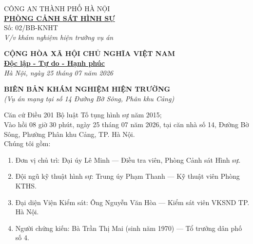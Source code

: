 \documentclass[12pt,a4paper]{article}
\begin{document}
\noindent
\begin{minipage}[t]{0.45\textwidth}
    \begin{center}
        \small
        CÔNG AN THÀNH PHỐ HÀ NỘI\\
        \textbf{\underline{PHÒNG CẢNH SÁT HÌNH SỰ}}\\[0.1cm]
        Số: 02/BB-KNHT\\
        \textit{V/v khám nghiệm hiện trường vụ án}
    \end{center}
\end{minipage}
\hfill
\begin{minipage}[t]{0.52\textwidth}
    \begin{center}
        \small
        \textbf{CỘNG HÒA XÃ HỘI CHỦ NGHĨA VIỆT NAM}\\
        \textbf{\underline{Độc lập - Tự do - Hạnh phúc}}\\[0.1cm]
        \textit{Hà Nội, ngày 25 tháng 07 năm 2026}
    \end{center}
\end{minipage}

\vspace{0.6cm}

\begin{center}
    \textbf{\large BIÊN BẢN KHÁM NGHIỆM HIỆN TRƯỜNG}\\
    \textit{(Vụ án mạng tại số 14 Đường Bờ Sông, Phân khu Cảng)}
\end{center}

\vspace{0.3cm}

\noindent Căn cứ Điều 201 Bộ luật Tố tụng hình sự năm 2015;\\
Vào hồi 08 giờ 30 phút, ngày 25 tháng 07 năm 2026, tại căn nhà số 14, Đường Bờ Sông, Phường Phân khu Cảng, TP. Hà Nội.\\[0.1cm]
Chúng tôi gồm:
\begin{enumerate}[label=\arabic*., leftmargin=1.5cm]
    \item Đơn vị chủ trì: Đại úy Lê Minh — Điều tra viên, Phòng Cảnh sát Hình sự.
    \item Đội ngũ kỹ thuật hình sự: Trung úy Phạm Thanh — Kỹ thuật viên Phòng KTHS.
    \item Đại diện Viện Kiểm sát: Ông Nguyễn Văn Hòa — Kiểm sát viên VKSND TP. Hà Nội.
    \item Người chứng kiến: Bà Trần Thị Mai (sinh năm 1970) — Tổ trưởng dân phố số 4.
\end{enumerate}
\end{document}
